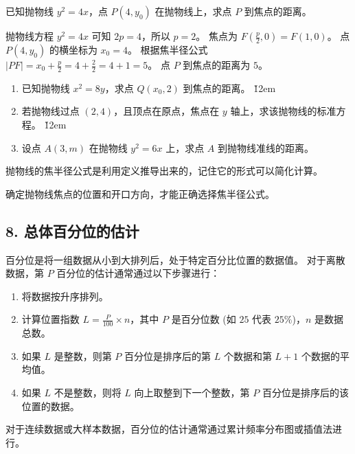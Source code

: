 \begin{example}
    已知抛物线 $y^2 = 4x$，点 $P(4, y_0)$ 在抛物线上，求点 $P$ 到焦点的距离。
\end{example}
\begin{solution}
    抛物线方程 $y^2 = 4x$ 可知 $2p=4$，所以 $p=2$。
    焦点为 $F(\frac{p}{2}, 0) = F(1, 0)$。
    点 $P(4, y_0)$ 的横坐标为 $x_0 = 4$。
    根据焦半径公式 $|PF| = x_0 + \frac{p}{2} = 4 + \frac{2}{2} = 4 + 1 = 5$。
    点 $P$ 到焦点的距离为 $5$。
\end{solution}

\begin{problem}
\begin{enumerate}
    \item 已知抛物线 $x^2 = 8y$，求点 $Q(x_0, 2)$ 到焦点的距离。
          \v{12em}
    \item 若抛物线过点 $(2, 4)$，且顶点在原点，焦点在 $y$ 轴上，求该抛物线的标准方程。
          \v{12em}
    \item 设点 $A(3, m)$ 在抛物线 $y^2 = 6x$ 上，求点 $A$ 到抛物线准线的距离。
\end{enumerate}
\end{problem}
\begin{tips}
    抛物线的焦半径公式是利用定义推导出来的，记住它的形式可以简化计算。
\end{tips}
\begin{warning}
    确定抛物线焦点的位置和开口方向，才能正确选择焦半径公式。
\end{warning}

\subsection*{8. 总体百分位的估计}
\begin{theorem}
    百分位是将一组数据从小到大排列后，处于特定百分比位置的数据值。
    对于离散数据，第 $P$ 百分位的估计通常通过以下步骤进行：
    \begin{enumerate}
        \item 将数据按升序排列。
        \item 计算位置指数 $L = \frac{P}{100} \times n$，其中 $P$ 是百分位数 (如 $25$ 代表 $25\%$)，$n$ 是数据总数。
        \item 如果 $L$ 是整数，则第 $P$ 百分位是排序后的第 $L$ 个数据和第 $L+1$ 个数据的平均值。
        \item 如果 $L$ 不是整数，则将 $L$ 向上取整到下一个整数，第 $P$ 百分位是排序后的该位置的数据。
    \end{enumerate}
    对于连续数据或大样本数据，百分位的估计通常通过累计频率分布图或插值法进行。
\end{theorem}

